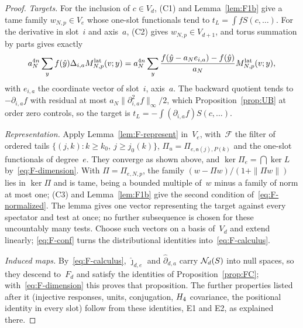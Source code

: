 \begin{proof}
\emph{Targets.} For the inclusion of $c\in V_d$, (C1) and Lemma~\ref{lem:F1b} give a tame family $w_{N,p}\in V_e$ whose one-slot functionals tend to $t_L=\int fS(c,\ldots)$. For the derivative in slot~$i$ and axis~$a$, (C2) gives $w_{N,p}\in V_{d+1}$, and torus summation by parts gives exactly
\begin{equation}\label{eq:F-parts}
a_N^{4n}\sum_y f(\hat y)\Delta_{i,a}M^{\mathrm{lat}}_{N,p}(v;y)
=a_N^{4n}\sum_y\frac{f(\hat y-a_Ne_{i,a})-f(\hat y)}{a_N}M^{\mathrm{lat}}_{N,p}(v;y),
\end{equation}
with $e_{i,a}$ the coordinate vector of slot~$i$, axis~$a$. The backward quotient tends to~$-\partial_{i,a}f$ with residual at most $a_N\|\partial_{i,a}^2f\|_\infty/2$, which Proposition~\ref{prop:UB} at order zero controls, so the target is $t_L=-\int(\partial_{i,a}f)S(c,\ldots)$.

\emph{Representation.} Apply Lemma~\ref{lem:F-represent} in~$V_e$, with~$\mathcal F$ the filter of ordered tails $\{(j,k):k\ge k_0,\ j\ge j_0(k)\}$, $\Pi_u=\Pi_{e,\mathsf n(j),P(k)}$ and the one-slot functionals of degree~$e$. They converge as shown above, and $\ker\Pi_e=\bigcap\ker L$ by~\eqref{eq:F-dimension}. With $\Pi=\Pi_{e,N,p}$, the family $(w-\Pi w)/(1+\|\Pi w\|)$ lies in $\ker\Pi$ and is tame, being a bounded multiple of~$w$ minus a family of norm at most one; (C3) and Lemma~\ref{lem:F1b} give the second condition of~\eqref{eq:F-normalized}. The lemma gives one vector representing the target against every spectator and test at once; no further subsequence is chosen for these uncountably many tests. Choose such vectors on a basis of~$V_d$ and extend linearly; \eqref{eq:F-conf} turns the distributional identities into~\eqref{eq:F-calculus}.

\emph{Induced maps.} By~\eqref{eq:F-calculus}, $\hat\jmath_{d,e}$ and $\hat\partial_{d,a}$ carry $\mathcal{N}_{d}(S)$ into null spaces, so they descend to~$F_d$ and satisfy the identities of Proposition~\ref{prop:FC}; with~\eqref{eq:F-dimension} this proves that proposition. The further properties listed after it (injective responses, units, conjugation, $H_4$ covariance, the positional identity in every slot) follow from these identities, E1 and E2, as explained there.
\end{proof}

